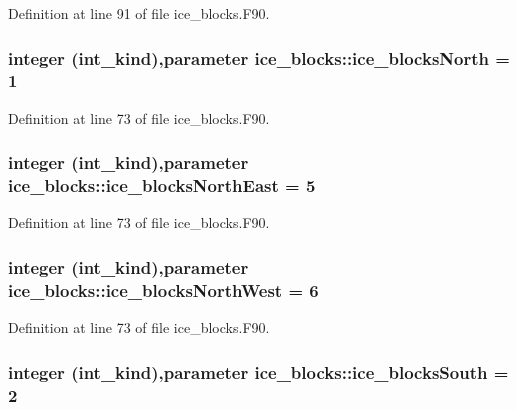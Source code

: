 Definition at line 91 of file ice\_\-blocks.F90.\hypertarget{namespaceice__blocks_a210c398febe5f3f1486ca6857c74eaef}{
\subsubsection[{ice\_\-blocksNorth}]{\setlength{\rightskip}{0pt plus 5cm}integer (int\_\-kind),parameter {\bf ice\_\-blocks::ice\_\-blocksNorth} = 1}}
\label{namespaceice__blocks_a210c398febe5f3f1486ca6857c74eaef}


Definition at line 73 of file ice\_\-blocks.F90.\hypertarget{namespaceice__blocks_aafd6325ce3debeffc94852fcb23a84ae}{
\subsubsection[{ice\_\-blocksNorthEast}]{\setlength{\rightskip}{0pt plus 5cm}integer (int\_\-kind),parameter {\bf ice\_\-blocks::ice\_\-blocksNorthEast} = 5}}
\label{namespaceice__blocks_aafd6325ce3debeffc94852fcb23a84ae}


Definition at line 73 of file ice\_\-blocks.F90.\hypertarget{namespaceice__blocks_a0f76d74a663f9c4518764417afdbcb4e}{
\subsubsection[{ice\_\-blocksNorthWest}]{\setlength{\rightskip}{0pt plus 5cm}integer (int\_\-kind),parameter {\bf ice\_\-blocks::ice\_\-blocksNorthWest} = 6}}
\label{namespaceice__blocks_a0f76d74a663f9c4518764417afdbcb4e}


Definition at line 73 of file ice\_\-blocks.F90.\hypertarget{namespaceice__blocks_a99adb4e499fb158490e25611f9b2d523}{
\subsubsection[{ice\_\-blocksSouth}]{\setlength{\rightskip}{0pt plus 5cm}integer (int\_\-kind),parameter {\bf ice\_\-blocks::ice\_\-blocksSouth} = 2}}
\label{namespaceice__blocks_a99adb4e499fb158490e25611f9b2d523}


